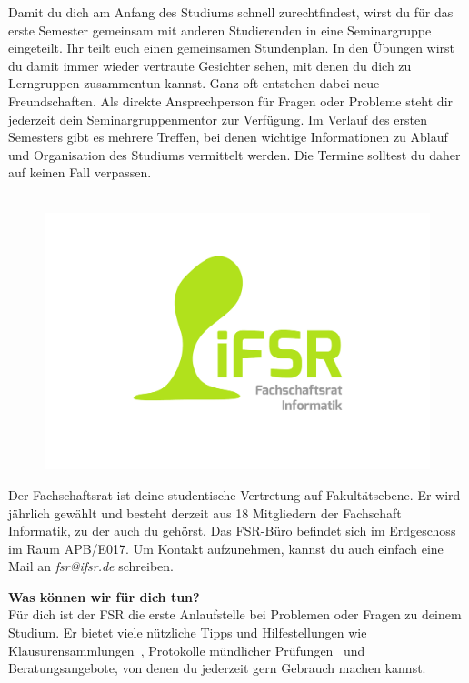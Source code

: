 \pagebreak

\label{sec:seminargruppen}
Damit du dich am Anfang des Studiums schnell zurechtfindest, wirst du für das erste Semester gemeinsam mit anderen Studierenden in eine Seminargruppe eingeteilt.
Ihr teilt euch einen gemeinsamen Stundenplan.
In den Übungen wirst du damit immer wieder vertraute Gesichter sehen, mit denen du dich zu Lerngruppen zusammentun kannst.
Ganz oft entstehen dabei neue Freundschaften.
Als direkte Ansprechperson für Fragen oder Probleme steht dir jederzeit dein Seminargruppenmentor zur Verfügung.
Im Verlauf des ersten Semesters gibt es mehrere Treffen, bei denen wichtige Informationen zu Ablauf und Organisation des Studiums vermittelt werden. Die Termine solltest du daher auf keinen Fall verpassen.


\label{sec:fachschaftsrat}
\begin{figure}\ \\[-1cm]
\flushright\includegraphics[width=\linewidth, trim=160 150 150 50, clip]{img/fsr_logo}
\end{figure}

Der Fachschaftsrat ist deine studentische Vertretung auf Fakultätsebene.
Er wird jährlich gewählt und besteht derzeit aus 18 Mitgliedern der Fachschaft Informatik, zu der auch du gehörst.
Das FSR-Büro befindet sich im Erdgeschoss im Raum APB/E017.
Um Kontakt aufzunehmen, kannst du auch einfach eine Mail an \textit{fsr@ifsr.de} schreiben.

\textbf{Was können wir für dich tun?} \\
Für dich ist der FSR die erste Anlaufstelle bei Problemen oder Fragen zu deinem Studium. Er bietet viele nützliche Tipps und Hilfestellungen wie Klausurensammlungen~, Protokolle mündlicher Prüfungen~ und Beratungsangebote, von denen du jederzeit gern Gebrauch machen kannst.

